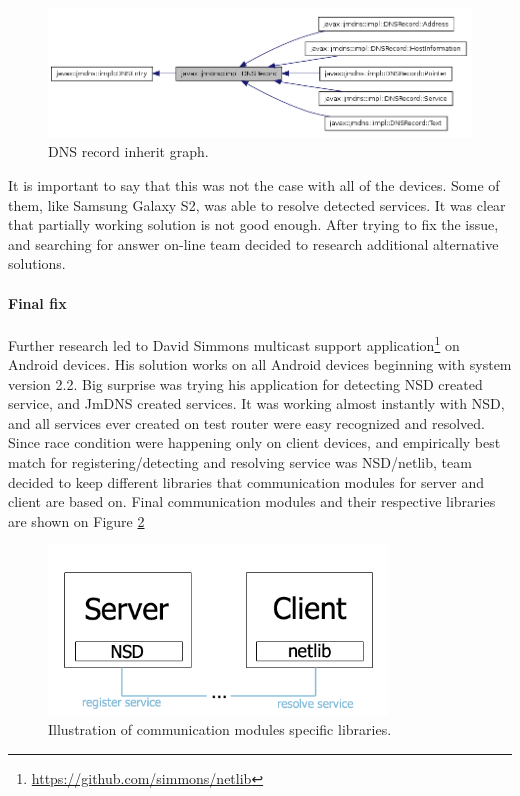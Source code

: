 \begin{figure}[H]
	\centering
		\includegraphics[width=17cm]{sprint5/jmdns.png}
	\caption{DNS record inherit graph.}
	\label{fig:DNS record inherit graph }
\end{figure}

It is important to say that this was not the case with all of the devices. Some of them, like Samsung Galaxy S2, was able to resolve detected services. It was clear that partially working solution is not good enough. After trying to fix the issue, and searching for answer on-line team decided to research additional alternative solutions.

\paragraph{Final fix}
Further research led to David Simmons multicast support application\footnote{\url{https://github.com/simmons/netlib}} on Android devices. His solution works on all Android devices beginning with system version 2.2. Big surprise was trying his application for detecting NSD created service, and JmDNS created services. It was working almost instantly with NSD, and all services ever created on test router were easy recognized and resolved. Since race condition were happening only on client devices, and empirically best match for registering/detecting and resolving service was NSD/netlib, team decided to keep different libraries that communication modules for server and client are based on. Final communication modules and their respective libraries are shown on Figure \ref{fig:Communication modules }

\begin{figure}[H]
	\centering
		\includegraphics[width=9cm]{sprint5/com.png}
	\caption{Illustration of communication modules specific libraries.}
	\label{fig:Communication modules }
\end{figure}

